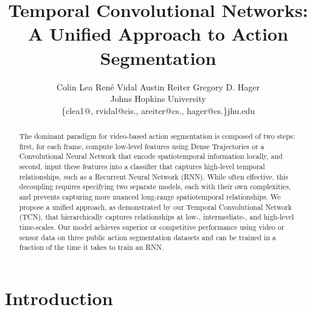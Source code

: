 \documentclass[10pt,twocolumn,letterpaper]{article}
\begin{document}
\title{Temporal Convolutional Networks: \\A Unified Approach to Action Segmentation}

\author{Colin Lea 
	\hspace{11px} Ren\'{e} Vidal  
	\hspace{11px} Austin Reiter
	\hspace{11px} Gregory D. Hager   \\	
Johns Hopkins University \\
	 \{clea1@, rvidal@cis., areiter@cs., hager@cs.\}jhu.edu
}




\maketitle
\begin{abstract}

The dominant paradigm for video-based action segmentation is composed of two steps:
first, for each frame, compute low-level features using Dense Trajectories or a Convolutional Neural Network that encode spatiotemporal information locally, and second, input these features into a classifier that captures high-level temporal relationships, such as a Recurrent Neural Network (RNN). 
While often effective, this decoupling requires specifying two separate models, each with their own complexities, and prevents capturing more nuanced long-range spatiotemporal relationships.
We propose a unified approach, as demonstrated by our Temporal Convolutional Network (TCN), that hierarchically captures relationships at low-, intermediate-, and high-level time-scales.
Our model achieves superior or competitive performance using video or sensor data on three public action segmentation datasets and can be trained in a fraction of the time it takes to train an RNN.


\end{abstract} \section{Introduction}
\label{sec:intro}
\end{document}
